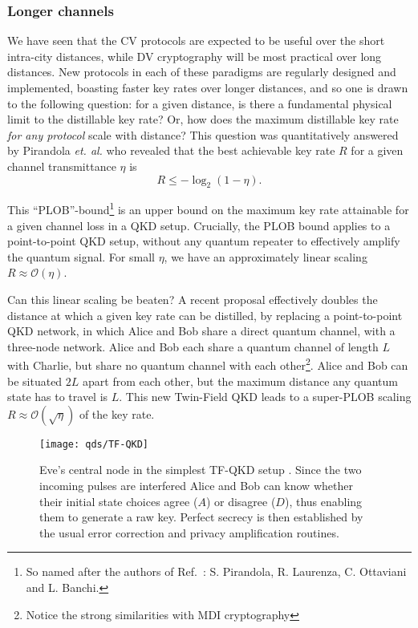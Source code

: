 \subsubsection*{Longer channels}
We have seen that the CV protocols are expected to be useful over the short intra-city distances, while DV cryptography will be most practical over long distances. New protocols in each of these paradigms are regularly designed and implemented, boasting faster key rates over longer distances, and so one is drawn to the following question: for a given distance, is there a fundamental physical limit to the distillable key rate? Or, how does the maximum distillable key rate \emph{for any protocol} scale with distance? This question was quantitatively answered by Pirandola \emph{et. al.} \cite{Pirandola2017} who revealed that the best achievable key rate $R$ for a given channel transmittance $\eta$ is
\begin{equation}\label{eqn:plob}
R \le - \log_2\left(1 - \eta\right).
\end{equation}

\noindent This ``PLOB''-bound\footnote{So named after the authors of Ref.~\cite{Pirandola2017}: S. Pirandola, R. Laurenza, C. Ottaviani and L. Banchi.} is an upper bound on the maximum key rate attainable for a given channel loss in a QKD setup. Crucially, the PLOB bound applies to a point-to-point QKD setup, without any quantum repeater to effectively amplify the quantum signal. For small $\eta$, we have an approximately linear scaling $R \approx \mathcal{O}\left(\eta\right)$. 

Can this linear scaling be beaten? A recent proposal \cite{Lucamarini2018} effectively doubles the distance at which a given key rate can be distilled, by replacing a point-to-point QKD network, in which Alice and Bob share a direct quantum channel, with a three-node network. Alice and Bob each share a quantum channel of length $L$ with Charlie, but share no quantum channel with each other\footnote{Notice the strong similarities with MDI cryptography}. Alice and Bob can be situated $2 L$ apart from each other, but the maximum distance any quantum state has to travel is $L$. This new Twin-Field QKD leads to a super-PLOB scaling $R \approx \mathcal{O}\left(\sqrt{\eta}\right)$ of the key rate. 

\begin{figure}[htp]
\captionsetup{width=\linewidth}
\centering
\texttt{[image: qds/TF-QKD]}
\caption{\label{fig:tfqkd} Eve's central node in the simplest TF-QKD setup \cite{Barnett2019}. Since the two incoming pulses are interfered Alice and Bob can know whether their initial state choices agree ($A$) or disagree ($D$), thus enabling them to generate a raw key.  Perfect secrecy is then established by the usual error correction and privacy amplification routines.}
\end{figure}


